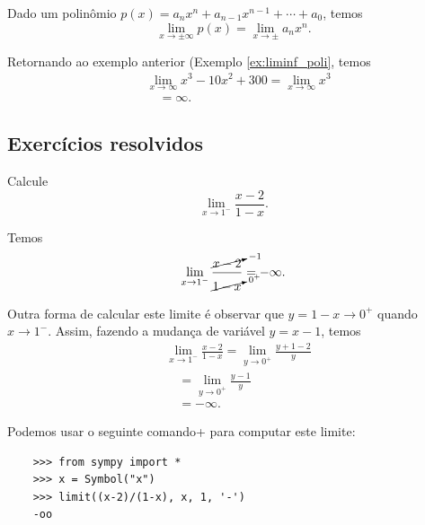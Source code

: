 \begin{prop}
  Dado um polinômio $p(x) = a_nx^n + a_{n-1}x^{n-1} + \cdots + a_0$, temos
  \begin{equation}
    \lim_{x\to \pm\infty} p(x) = \lim_{x\to\pm} a_nx^n.
  \end{equation}
\end{prop}

\begin{ex}
  Retornando ao exemplo anterior (Exemplo \ref{ex:liminf_poli}, temos
  \begin{align}
    & \lim_{x\to \infty} x^3 - 10x^2 + 300 = \lim_{x\to \infty} x^3 \\
    & \text{}\quad = \infty.
  \end{align}
\end{ex}

\subsection{Exercícios resolvidos}


\begin{exeresol}
  Calcule
  \begin{equation}
    \lim_{x\to 1^-} \frac{x-2}{1-x}. 
  \end{equation}
\end{exeresol}
\begin{resol}
  Temos
  \begin{equation}
    \lim_{x\to 1^-} \frac{\cancelto{-1}{x-2}}{\cancelto{0^+}{1-x}} = -\infty.
  \end{equation}

  Outra forma de calcular este limite é observar que $y = 1-x\to 0^+$ quando $x\to 1^-$. Assim, fazendo a mudança de variável $y = x-1$, temos
  \begin{align}
    & \lim_{x\to 1^-} \frac{x-2}{1-x} = \lim_{y\to 0^+} \frac{y+1-2}{y} \\
    & \text{}\quad = \lim_{y\to 0^+} \frac{y-1}{y} \\
    & \text{}\quad = -\infty.
  \end{align}

  \ifispython
  Podemos usar o seguinte comando{\python}+{\sympy} para computar este limite:
  \begin{lstlisting}
    >>> from sympy import *
    >>> x = Symbol("x")
    >>> limit((x-2)/(1-x), x, 1, '-')
    -oo
  \end{lstlisting}
  \fi
\end{resol}

